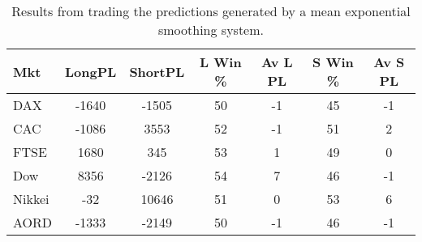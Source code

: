 \begin{table}[ht]
\centering
\caption[Results from trading the predictions generated by a mean exponential smoothing system]{Results from trading the predictions generated by a mean exponential smoothing system.} 
\label{tab:es_mean_sys}
\begin{tabular}{lcccccc}
  \toprule Mkt & LongPL & ShortPL & L Win \% & Av L PL & S Win \% & Av S PL \\ 
  \midrule DAX & -1640 & -1505 & 50 & -1 & 45 & -1 \\ 
  CAC & -1086 & 3553 & 52 & -1 & 51 & 2 \\ 
  FTSE & 1680 & 345 & 53 & 1 & 49 & 0 \\ 
  Dow & 8356 & -2126 & 54 & 7 & 46 & -1 \\ 
  Nikkei & -32 & 10646 & 51 & 0 & 53 & 6 \\ 
  AORD & -1333 & -2149 & 50 & -1 & 46 & -1 \\ 
   \bottomrule \end{tabular}
\end{table}

